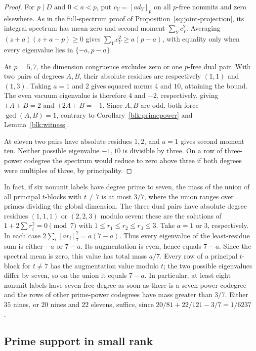 \documentclass[11pt]{amsart}
\numberwithin{equation}{section}
\theoremstyle{definition}
\theoremstyle{plain}
\begin{document}
\begin{proof}
For $p\mid D$ and $0<a<p$, put $c_Y=[ad_Y]_p$ on all $p$-free
nonunits and zero elsewhere. As in the full-spectrum proof of
Proposition~\ref{sq:joint-projection}, its integral spectrum has mean
zero and second moment $\sum_Yc_Y^2$. Averaging
$(z+a)(z+a-p)\ge0$ gives $\sum_Yc_Y^2\ge a(p-a)$, with equality
only when every eigenvalue lies in $\{-a,p-a\}$.

At $p=5,7$, the dimension congruence excludes zero or one $p$-free
dual pair. With two pairs of degrees $A,B$, their absolute residues
are respectively $(1,1)$ and $(1,3)$. Taking $a=1$ and $2$ gives
squared norms $4$ and $10$, attaining the bound. The even vacuum
eigenvalue is therefore $4$ and $-2$, respectively, giving
$\pm A\pm B=2$ and $\pm2A\pm B=-1$. Since $A,B$ are odd,
both force $\gcd(A,B)=1$, contrary to
Corollary~\ref{blk:primepower} and Lemma~\ref{blk:witness}.

At eleven two pairs have absolute residues $1,2$, and $a=1$ gives
second moment ten. Neither possible eigenvalue $-1,10$ is
divisible by three. On a row of three-power codegree the spectrum
would reduce to zero above three if both degrees were multiples of
three, by principality.
\end{proof}

In fact, if six nonunit labels have degree prime to seven, the mass
of the union of all principal $t$-blocks with $t\ne7$ is at most
$3/7$, where the union ranges over primes dividing the global
dimension. The three dual pairs have absolute degree residues
$(1,1,1)$ or $(2,2,3)$ modulo seven: these are the solutions of
$1+2\sum r_i^2=0\pmod7$ with $1\le r_1\le r_2\le r_3\le3$.
Take $a=1$ or $3$, respectively. In each case
$2\sum_i[ar_i]_7^2=a(7-a)$. Thus every eigenvalue of the
least-residue sum is either $-a$ or $7-a$. Its augmentation is even,
hence equals $7-a$. Since the spectral mean is zero, this value
has total mass $a/7$. Every row of a principal $t$-block for
$t\ne7$ has the augmentation value modulo $t$; the two possible
eigenvalues differ by seven, so on the union it equals $7-a$.
In particular, at least eight nonunit labels have seven-free degree
as soon as there is a seven-power codegree and the rows of other
prime-power codegrees have mass greater than $3/7$. Either
$35$ nines, or $20$ nines and $22$ elevens, suffice, since
$20/81+22/121-3/7=1/6237$.

\subsection{Prime support in small rank}
\end{document}
